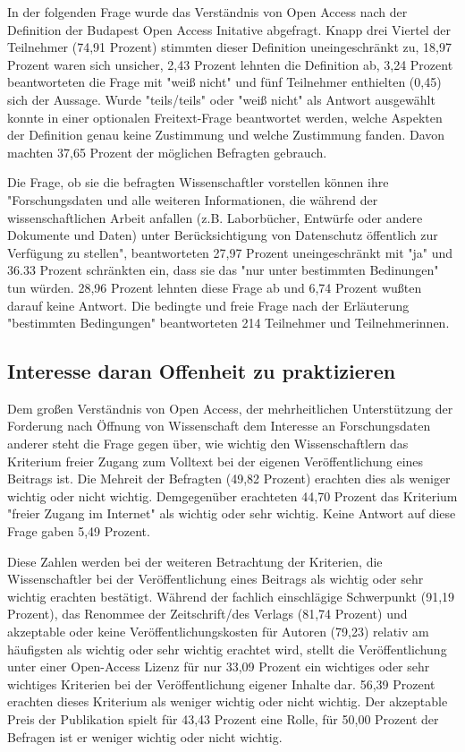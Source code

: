 In der folgenden Frage wurde das Verständnis von Open Access nach der Definition der Budapest Open Access Initative \cite{boai_2012} abgefragt. Knapp drei Viertel der Teilnehmer (74,91 Prozent) stimmten dieser Definition uneingeschränkt zu, 18,97 Prozent waren sich unsicher, 2,43 Prozent lehnten die Definition ab, 3,24 Prozent beantworteten die Frage mit "weiß nicht" und fünf Teilnehmer enthielten (0,45) sich der Aussage. Wurde "teils/teils" oder "weiß nicht" als Antwort ausgewählt konnte in einer optionalen Freitext-Frage beantwortet werden, welche Aspekten der Definition genau keine Zustimmung und welche Zustimmung fanden. Davon machten 37,65 Prozent der möglichen Befragten gebrauch.

Die Frage, ob sie die befragten Wissenschaftler vorstellen können ihre "Forschungsdaten und alle weiteren Informationen, die während der wissenschaftlichen Arbeit anfallen (z.B. Laborbücher, Entwürfe oder andere Dokumente und Daten) unter Berücksichtigung von Datenschutz öffentlich zur Verfügung zu stellen", beantworteten 27,97 Prozent uneingeschränkt mit "ja" und 36.33 Prozent schränkten ein, dass sie das "nur unter bestimmten Bedinungen" tun würden.  28,96 Prozent lehnten diese Frage ab und 6,74 Prozent wußten darauf keine Antwort. Die bedingte und freie Frage nach der Erläuterung "bestimmten Bedingungen" beantworteten 214 Teilnehmer und Teilnehmerinnen.

\subsection{Interesse daran Offenheit zu praktizieren}

Dem großen Verständnis von Open Access, der mehrheitlichen Unterstützung der Forderung nach Öffnung von Wissenschaft dem Interesse an Forschungsdaten anderer steht die Frage gegen über, wie wichtig den Wissenschaftlern das Kriterium freier Zugang zum Volltext bei der eigenen Veröffentlichung eines Beitrags ist. Die Mehreit der Befragten (49,82 Prozent) erachten dies als weniger wichtig oder nicht wichtig. Demgegenüber erachteten 44,70 Prozent das Kriterium "freier Zugang im Internet" als wichtig oder sehr wichtig. Keine Antwort auf diese Frage gaben 5,49 Prozent.

Diese Zahlen werden bei der weiteren Betrachtung der Kriterien, die Wissenschaftler bei der Veröffentlichung eines Beitrags als wichtig oder sehr wichtig erachten bestätigt. Während der fachlich einschlägige Schwerpunkt (91,19 Prozent), das Renommee der Zeitschrift/des Verlags (81,74 Prozent) und akzeptable oder keine Veröffentlichungskosten für Autoren (79,23) relativ am häufigsten als wichtig oder sehr wichtig erachtet wird, stellt die Veröffentlichung unter einer Open-Access Lizenz für nur 33,09 Prozent ein wichtiges oder sehr wichtiges Kriterien bei der Veröffentlichung eigener Inhalte dar. 56,39 Prozent erachten dieses Kriterium als weniger wichtig oder nicht wichtig. Der akzeptable Preis der Publikation spielt für 43,43 Prozent eine Rolle, für 50,00 Prozent der Befragen ist er weniger wichtig oder nicht wichtig.

